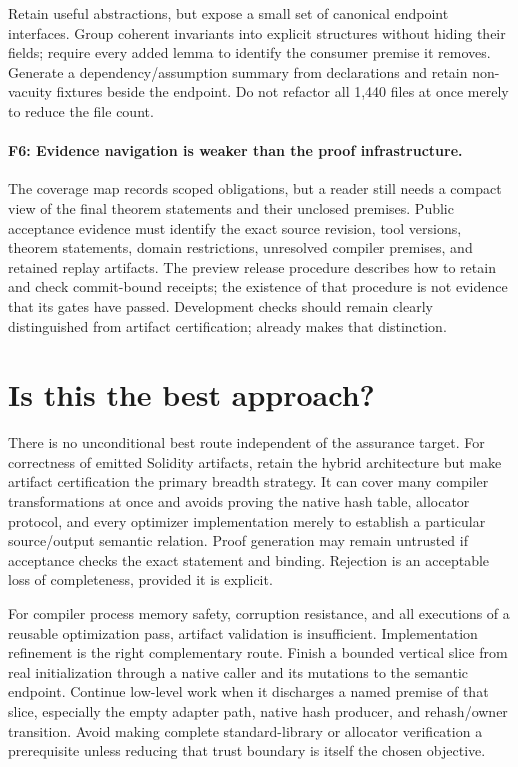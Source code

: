 \documentclass[conference]{IEEEtran}
\newcommand{\src}[1]{\path{#1}}
\begin{document}
Retain useful abstractions, but expose a small set of canonical endpoint
interfaces. Group coherent invariants into explicit structures without hiding
their fields; require every added lemma to identify the consumer premise it
removes. Generate a dependency/assumption summary from declarations and retain
non-vacuity fixtures beside the endpoint. Do not refactor all 1,440 files at
once merely to reduce the file count.

\paragraph{F6: Evidence navigation is weaker than the proof infrastructure.}
The coverage map records scoped obligations, but a reader still needs a
compact view of the final theorem statements and their unclosed premises.
Public acceptance evidence must identify the exact source revision, tool
versions, theorem statements, domain restrictions, unresolved compiler
premises, and retained replay artifacts. The preview release procedure
describes how to retain and check commit-bound receipts; the existence of that
procedure is not evidence that its gates have passed. Development checks should remain clearly distinguished from
artifact certification; \src{prove.py} already makes that distinction.

\section{Is this the best approach?}
There is no unconditional best route independent of the assurance target.
For correctness of emitted Solidity artifacts, retain the hybrid architecture
but make artifact certification the primary breadth strategy. It can cover
many compiler transformations at once and avoids proving the native hash table,
allocator protocol, and every optimizer implementation merely to establish a
particular source/output semantic relation. Proof generation may remain
untrusted if acceptance checks the exact statement and binding. Rejection is
an acceptable loss of completeness, provided it is explicit.

For compiler process memory safety, corruption resistance, and all executions
of a reusable optimization pass, artifact validation is insufficient.
Implementation refinement is the right complementary route. Finish a bounded
vertical slice from real initialization through a native caller and its
mutations to the semantic endpoint. Continue low-level work when it discharges
a named premise of that slice, especially the empty adapter path, native hash
producer, and rehash/owner transition. Avoid making complete standard-library
or allocator verification a prerequisite unless reducing that trust boundary
is itself the chosen objective.
\end{document}
